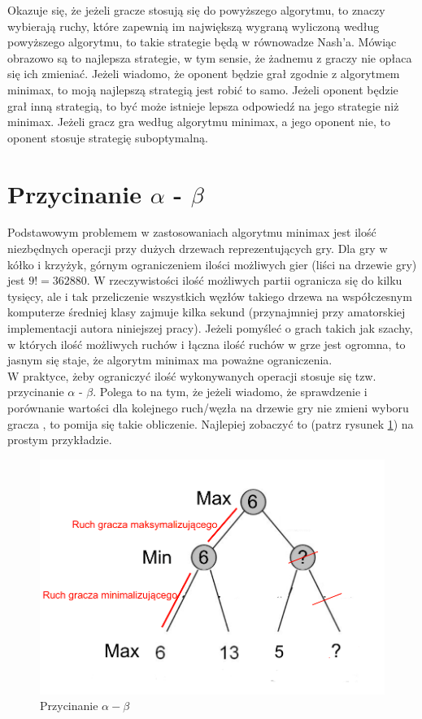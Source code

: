 \documentclass[licencjacka]{pracamgr}
\begin{document}
Okazuje się, że jeżeli gracze stosują się do powyższego algorytmu, to znaczy wybierają ruchy, które zapewnią im największą wygraną wyliczoną według powyższego algorytmu, to takie strategie będą w równowadze Nash'a. Mówiąc obrazowo są  to najlepsza strategie, w tym sensie, że żadnemu z graczy nie opłaca się ich zmieniać. Jeżeli wiadomo, że oponent będzie grał zgodnie z algorytmem minimax, to moją najlepszą strategią jest robić to samo. Jeżeli  oponent będzie grał inną strategią, to być może istnieje lepsza odpowiedź na jego strategie niż minimax. Jeżeli gracz gra według algorytmu minimax, a jego oponent nie, to oponent stosuje strategię suboptymalną. 

\section{Przycinanie $\alpha$ - $\beta$}
Podstawowym problemem w zastosowaniach algorytmu minimax jest ilość niezbędnych operacji przy dużych drzewach reprezentujących gry.  Dla gry w kółko i krzyżyk, górnym ograniczeniem ilości możliwych gier (liści na drzewie gry) jest $9! = 362880$. W rzeczywistości ilość możliwych partii ogranicza się do kilku tysięcy, ale i tak przeliczenie wszystkich węzłów takiego drzewa na współczesnym komputerze średniej klasy zajmuje kilka sekund (przynajmniej przy amatorskiej implementacji autora niniejszej pracy). Jeżeli pomyśleć o grach takich jak szachy, w których ilość możliwych ruchów i łączna ilość ruchów w grze jest ogromna, to jasnym się staje, że algorytm minimax ma poważne ograniczenia.  \\

W praktyce, żeby ograniczyć ilość wykonywanych operacji stosuje się tzw. przycinanie  $\alpha$ - $\beta$. Polega to na tym, że jeżeli wiadomo, że sprawdzenie i porównanie wartości dla kolejnego ruch/węzła na drzewie gry nie zmieni wyboru gracza , to pomija się takie obliczenie. Najlepiej zobaczyć to (patrz rysunek \ref{Rys3}) na prostym przykładzie. 

\begin{figure}[h!]
	\includegraphics [scale=0.3] {advertise2.png}
	\caption{Przycinanie $\alpha - \beta$}
	\label{Rys3}
\end{figure}
\end{document}

